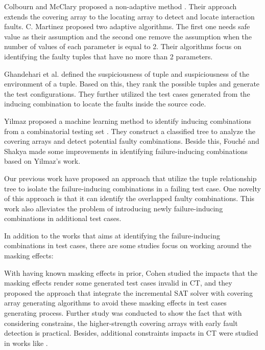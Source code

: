 \documentclass{sig-alternate}
\begin{document}
Colbourn and McClary proposed a non-adaptive method \cite{colbourn2008locating}. Their approach extends the covering array to the locating array to detect and locate interaction faults. C. Martinez proposed two adaptive algorithms. The first one needs safe value as their assumption and the second one remove the assumption when the number of values of each parameter is equal to 2\cite{martinez2008algorithms,martinez2009locating}. Their algorithms focus on identifying the faulty tuples that have no more than 2 parameters.

Ghandehari et al. defined the suspiciousness of tuple and suspiciousness of the environment of a tuple\cite{ghandehari2012identifying}. Based on this, they rank the possible tuples and generate the test configurations. They further utilized the test cases generated from the inducing combination to locate the faults inside the source code\cite{ghandehari2013fault}.

Yilmaz proposed a machine learning method to identify inducing combinations from a combinatorial testing set \cite{yilmaz2006covering}. They construct a classified tree to analyze the covering arrays and detect potential faulty combinations. Beside this, Fouch{\'e} \cite{fouche2009incremental} and Shakya \cite{shakya2012isolating} made some improvements in identifying failure-inducing combinations based on Yilmaz's work.

Our previous work \cite{niu2013identifying} have proposed an approach that utilize the tuple relationship tree to isolate the failure-inducing combinations in a failing test case. One novelty of this approach is that it can identify the overlapped faulty combinations. This work also alleviates the problem of introducing newly failure-inducing combinations in additional test cases.

In addition to the works that aims at identifying the failure-inducing combinations in test cases, there are some studies focus on working around the masking effects:

With having known masking effects in prior, Cohen \cite{cohen2007exploiting,cohen2007interaction,cohen2008constructing} studied the impacts that the masking effects render some generated test cases invalid in CT, and they proposed the approach that integrate the incremental SAT solver with covering array generating algorithms to avoid these masking effects in test cases generating process. Further study was conducted \cite{petke2013efficiency}to show the fact that with considering constrains, the higher-strength covering arrays with early fault detection is practical. Besides, additional constraints impacts in CT were studied in works like \cite{garvin2011evaluating,bryce2006prioritized,calvagna2008logic,grindal2006handling,yilmaz2013test}. %
\end{document}
